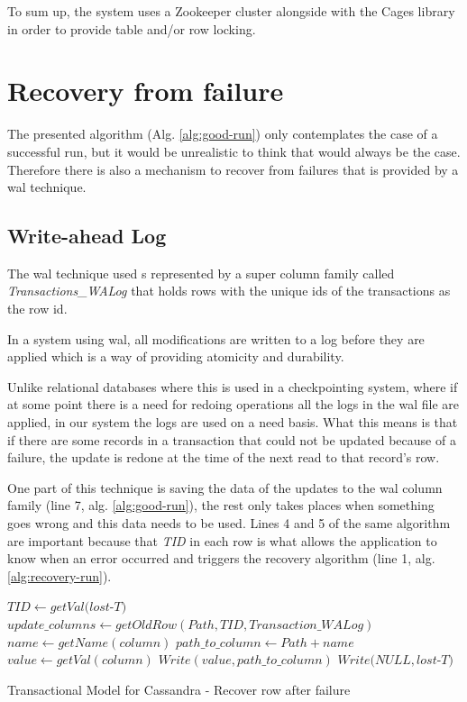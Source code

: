 To sum up, the system uses a Zookeeper cluster alongside with the Cages library in order to provide table and/or row locking.

\section{Recovery from failure}
\label{sec:rec_fail}
The presented algorithm (Alg. \ref{alg:good-run}) only contemplates the case of a successful run, but it would be unrealistic to think that would always be the case. Therefore there is also a mechanism to recover from failures that is provided by a \ac{wal} technique.  

\subsection{Write-ahead Log}
The \ac{wal} technique used s represented by a super column family called \emph{Transactions\_WALog} that holds rows with the unique ids of the transactions as the row id.

In a system using \ac{wal}, all modifications are written to a log before they are applied which is a way of providing atomicity and durability.

Unlike relational databases where this is used in a checkpointing system, where if at some point there is a need for redoing operations all the logs in the \ac{wal} file are applied, in our system the logs are used on a need basis. What this means is that if there are some records in a transaction that could not be updated because of a failure, the update is redone at the time of the next read to that record's row.

One part of this technique is saving the data of the updates to the \ac{wal} column family (line 7, alg. \ref{alg:good-run}), the rest only takes places when something goes wrong and this data needs to be used. Lines 4 and 5 of the same algorithm are important because that \emph{TID} in each row is what allows the application to know when an error occurred and triggers the recovery algorithm (line 1, alg. \ref{alg:recovery-run}).
 

\begin{algorithm}
  \DontPrintSemicolon
  \BlankLine
  {
	$TID \gets getVal(lost$-$T)$ \;
	$update\_columns \gets getOldRow(Path,TID,Transaction\_WALog)$ \;
	{
	  $name \gets getName(column)$ \;
	  $path\_to\_column \gets Path + name$ \;
	  $value \gets getVal(column)$ \;
	  $Write(value,path\_to\_column)$ \;
	}
	$Write(NULL,lost$-$T)$ \;
  }
 \caption{Transactional Model for Cassandra - Recover row after failure}
 \label{alg:recovery-run}
\end{algorithm}
 

